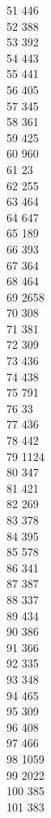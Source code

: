 { 51	446 \\
 52	388 \\
 53	392 \\
 54	443 \\
 55	441 \\
 56	405 \\
 57	345 \\
 58	361 \\
 59	425 \\
 60	960 \\
 61	23 \\
 62	255 \\
 63	464 \\
 64	647 \\
 65	189 \\
 66	393 \\
 67	364 \\
 68	464 \\
 69	2658 \\
 70	308 \\
 71	381 \\
 72	309 \\
 73	436 \\
 74	438 \\
 75	791 \\
 76	33 \\
 77	436 \\
 78	442 \\
 79	1124 \\
 80	347 \\
 81	421 \\
 82	269 \\
 83	378 \\
 84	395 \\
 85	578 \\
 86	341 \\
 87	387 \\
 88	337 \\
 89	434 \\
 90	386 \\
 91	366 \\
 92	335 \\
 93	348 \\
 94	465 \\
 95	309 \\
 96	408 \\
 97	466 \\
 98	1059 \\
 99	2022 \\
 100	385 \\
 101	383 \\
}
